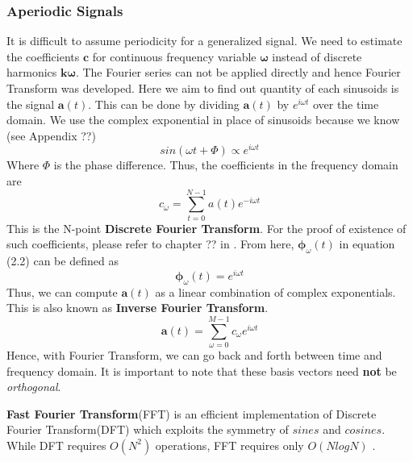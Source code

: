 \subsubsection{Aperiodic Signals}
It is difficult to assume periodicity for a generalized signal. We need to estimate the coefficients $\textbf{c}$ for continuous frequency variable $\bm{\omega}$ instead of discrete harmonics $\textbf{k}\bm{\omega}$. The Fourier series can not be applied directly and hence Fourier Transform was developed. Here we aim to find out quantity of each sinusoids is the signal $\textbf{a}(t)$. This can be done by dividing  $\textbf{a}(t)$ by $e^{i \omega t}$ over the time domain. We use the complex exponential in place of sinusoids because we know (see Appendix ??)
\begin{equation}
sin(\omega t + \Phi) \propto e^{i \omega t}
\end{equation} 
Where $\Phi$ is the phase difference. Thus, the coefficients in the frequency domain are 
\begin{equation}
c_{\omega} =  \displaystyle\sum_{t=0}^{N-1}a(t)e^{-i \omega t}
\end{equation}  
This is the N-point \textbf{Discrete Fourier Transform}. For the proof of existence of such coefficients, please refer to chapter ?? in \cite{allen}. From here, $\bm{\phi}_{ \omega }(t)$ in equation (2.2) can be defined as
\begin{equation}
\bm{\phi}_{ \omega }(t) = e^{i \omega t}
\end{equation}
Thus, we can compute $\textbf{a}(t)$ as a linear combination of complex exponentials. This is also known as \textbf{Inverse Fourier Transform}.
\begin{equation}
\textbf{a}(t) = \displaystyle\sum_{ \omega =0}^{M-1}c_{ \omega }e^{i \omega t} 
\end{equation}
Hence, with Fourier Transform, we can go back and forth between time and frequency domain. It is important to note that these basis vectors need \textbf{not} be \textit{orthogonal}.
\bigskip

\textbf{Fast Fourier Transform}(FFT) is an efficient implementation of Discrete Fourier Transform(DFT) which exploits the symmetry of $sines$ and $cosines$. While DFT requires $O(N^2)$ operations, FFT requires only $O(NlogN)$ \cite{allen}.  

